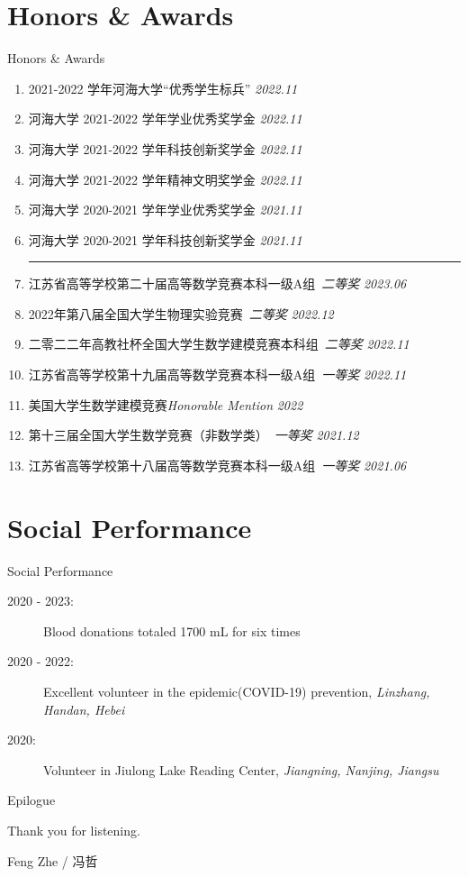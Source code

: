 \documentclass[9pt,aspectratio=169,hyperref=colorlinks]{beamer}
\begin{document}
\section{Honors \& Awards}
\begin{frame}{Honors \& Awards}
    \begin{enumerate}
        \item 2021-2022 学年河海大学“优秀学生标兵” \hfill \textit{2022.11}
        \item 河海大学 2021-2022 学年学业优秀奖学金 \hfill \textit{2022.11}
        \item 河海大学 2021-2022 学年科技创新奖学金 \hfill \textit{2022.11}
        \item 河海大学 2021-2022 学年精神文明奖学金 \hfill \textit{2022.11}
        \item 河海大学 2020-2021 学年学业优秀奖学金 \hfill \textit{2021.11}
        \item 河海大学 2020-2021 学年科技创新奖学金 \hfill \textit{2021.11}

              \medskip \hrule \medskip

        \item 江苏省高等学校第二十届高等数学竞赛本科一级A组\ \textit{二等奖} \hfill \textit{2023.06}
        \item 2022年第八届全国大学生物理实验竞赛\ \textit{二等奖}  \hfill \textit{2022.12}
        \item 二零二二年高教社杯全国大学生数学建模竞赛本科组\ \textit{二等奖} \hfill \textit{2022.11}
        \item 江苏省高等学校第十九届高等数学竞赛本科一级A组\ \textit{一等奖} \hfill \textit{2022.11}
        \item 美国大学生数学建模竞赛\textit{Honorable Mention} \hfill \textit{2022}
        \item 第十三届全国大学生数学竞赛（非数学类）\ \textit{一等奖} \hfill \textit{2021.12}
        \item 江苏省高等学校第十八届高等数学竞赛本科一级A组\ \textit{一等奖} \hfill \textit{2021.06}
    \end{enumerate}
\end{frame}

\section{Social Performance}
\begin{frame}{Social Performance}
    \begin{description}
        \item[2020 - 2023:] Blood donations totaled 1700 mL for six times
        \item[2020 - 2022:] Excellent volunteer in the epidemic(COVID-19) prevention, \textit{Linzhang, Handan, Hebei}
        \item[2020:] Volunteer in Jiulong Lake Reading Center, \textit{Jiangning, Nanjing, Jiangsu}
    \end{description}
\end{frame}

\begin{frame}{Epilogue}
    \begin{center}
        {\Huge \calligra Thank you for listening.}
        
        \vspace{5em}
        
        Feng Zhe / 冯哲
    \end{center}
\end{frame}
\end{document}
